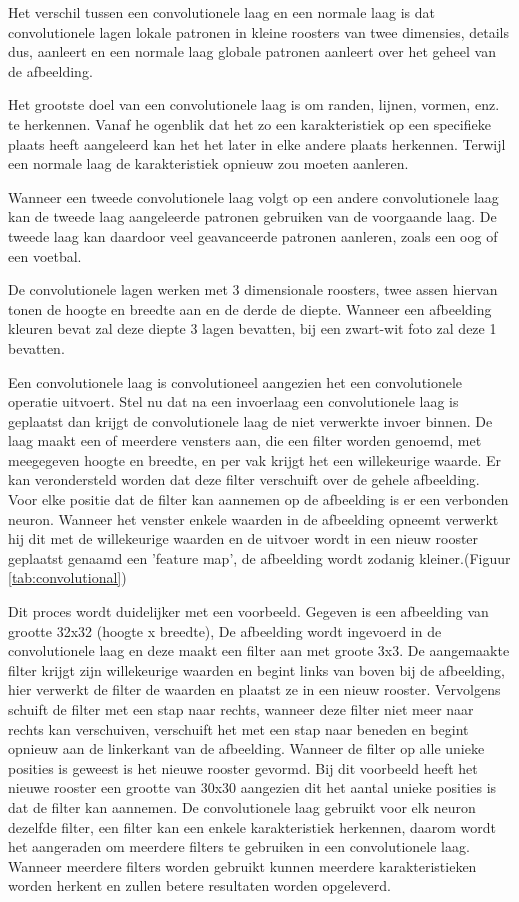 Het verschil tussen een convolutionele laag en een normale laag is dat convolutionele lagen 
lokale patronen in kleine roosters van twee dimensies, details dus, aanleert en een normale laag globale patronen aanleert over het geheel van de afbeelding.

Het grootste doel van een convolutionele laag is om randen, lijnen, vormen, enz. te herkennen.
Vanaf he ogenblik dat het zo een karakteristiek op een specifieke plaats heeft aangeleerd kan het het later in elke andere plaats herkennen. Terwijl een normale laag de karakteristiek opnieuw zou moeten aanleren.

Wanneer een tweede convolutionele laag volgt op een andere convolutionele laag kan de tweede laag aangeleerde patronen gebruiken van de voorgaande laag.
De tweede laag kan daardoor veel geavanceerde patronen aanleren, zoals een oog of een voetbal.

De convolutionele lagen werken met 3 dimensionale roosters, twee assen hiervan tonen de hoogte en breedte aan en de derde de diepte. Wanneer een afbeelding kleuren bevat zal deze diepte 3 lagen bevatten, bij een zwart-wit foto zal deze 1 bevatten.

Een convolutionele laag is convolutioneel aangezien het een convolutionele operatie uitvoert.
Stel nu dat na een invoerlaag een convolutionele laag is geplaatst
dan krijgt de convolutionele laag de niet verwerkte invoer binnen.
De laag maakt een of meerdere vensters aan, die een filter worden genoemd, met meegegeven hoogte en breedte, en per vak krijgt het een willekeurige waarde. Er kan verondersteld worden dat deze filter verschuift over de gehele afbeelding. Voor elke positie dat de filter kan aannemen op de afbeelding is er een verbonden neuron.
Wanneer het venster enkele waarden in de afbeelding opneemt verwerkt hij dit met de willekeurige waarden en de uitvoer wordt in een nieuw rooster geplaatst  genaamd een 'feature map', de afbeelding wordt zodanig kleiner.(Figuur \ref{tab:convolutional})

Dit proces wordt duidelijker met een voorbeeld.
Gegeven is een afbeelding van grootte 32x32 (hoogte x breedte),
De afbeelding wordt ingevoerd in de convolutionele laag en deze maakt een filter aan met groote 3x3.
De aangemaakte filter krijgt zijn willekeurige waarden en begint links van boven bij de afbeelding, hier verwerkt de filter de waarden en plaatst ze in een nieuw rooster. 
Vervolgens schuift de filter met een stap naar rechts, wanneer deze filter niet meer naar rechts kan verschuiven, verschuift het met een stap naar beneden en begint opnieuw aan de linkerkant van de afbeelding.
Wanneer de filter op alle unieke posities is geweest is het nieuwe rooster gevormd. Bij dit voorbeeld heeft het nieuwe rooster een grootte van 30x30 aangezien dit het aantal unieke posities is dat de filter kan aannemen.
De convolutionele laag gebruikt voor elk neuron dezelfde filter, een filter kan een enkele karakteristiek herkennen, daarom wordt het aangeraden om meerdere filters te gebruiken in een convolutionele laag.
Wanneer meerdere filters worden gebruikt kunnen meerdere karakteristieken worden herkent en zullen betere resultaten worden opgeleverd.




